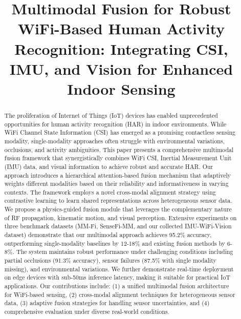 \documentclass[journal]{IEEEtran}
\begin{document}
\title{Multimodal Fusion for Robust WiFi-Based Human Activity Recognition: Integrating CSI, IMU, and Vision for Enhanced Indoor Sensing}

\author{
}

\maketitle

\begin{abstract}
The proliferation of Internet of Things (IoT) devices has enabled unprecedented opportunities for human activity recognition (HAR) in indoor environments. While WiFi Channel State Information (CSI) has emerged as a promising contactless sensing modality, single-modality approaches often struggle with environmental variations, occlusions, and activity ambiguities. This paper presents a comprehensive multimodal fusion framework that synergistically combines WiFi CSI, Inertial Measurement Unit (IMU) data, and visual information to achieve robust and accurate HAR. Our approach introduces a hierarchical attention-based fusion mechanism that adaptively weights different modalities based on their reliability and informativeness in varying contexts. The framework employs a novel cross-modal alignment strategy using contrastive learning to learn shared representations across heterogeneous sensor data. We propose a physics-guided fusion module that leverages the complementary nature of RF propagation, kinematic motion, and visual perception. Extensive experiments on three benchmark datasets (MM-Fi, SenseFi-MM, and our collected IMU-WiFi-Vision dataset) demonstrate that our multimodal approach achieves 95.2\% accuracy, outperforming single-modality baselines by 12-18\% and existing fusion methods by 6-8\%. The system maintains robust performance under challenging conditions including partial occlusions (91.3\% accuracy), sensor failures (87.5\% with single modality missing), and environmental variations. We further demonstrate real-time deployment on edge devices with sub-50ms inference latency, making it suitable for practical IoT applications. Our contributions include: (1) a unified multimodal fusion architecture for WiFi-based sensing, (2) cross-modal alignment techniques for heterogeneous sensor data, (3) adaptive fusion strategies for handling sensor uncertainties, and (4) comprehensive evaluation under diverse real-world conditions.
\end{abstract}
\end{document}
